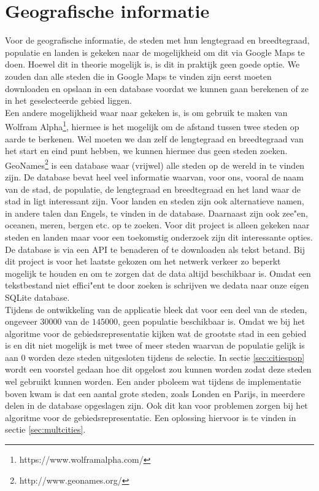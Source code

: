 \documentclass[twoside,openright]{uva-bachelor-thesis}
\begin{document}
	\section{Geografische informatie}
		\label{sec:geo_info}
		Voor de geografische informatie, de steden met hun lengtegraad en breedtegraad, populatie en landen is gekeken naar de mogelijkheid om dit via Google Maps te doen. Hoewel dit in theorie mogelijk is, is dit in praktijk geen goede optie. We zouden dan alle steden die in Google Maps te vinden zijn eerst moeten downloaden en opslaan in een database voordat we kunnen gaan berekenen of ze in het geselecteerde gebied liggen.
		\\[0.5cm]
		Een andere mogelijkheid waar naar gekeken is, is om gebruik te maken van Wolfram Alpha\footnote{https://www.wolframalpha.com/}, hiermee is het mogelijk om de afstand tussen twee steden op aarde te berkenen. Wel moeten we dan zelf de lengtegraad en breedtegraad van het start en eind punt hebben, we kunnen hiermee dus geen steden zoeken.
		\\[0.5cm]
		GeoNames\footnote{http://www.geonames.org/} is een database waar (vrijwel) alle steden op de wereld in te vinden zijn. De database bevat heel veel informatie waarvan, voor ons, vooral de naam van de stad, de populatie, de lengtegraad en breedtegraad en het land waar de stad in ligt interessant zijn. Voor landen en steden zijn ook alternatieve namen, in andere talen dan Engels, te vinden in de database. Daarnaast zijn ook zee"en, oceanen, meren, bergen etc. op te zoeken. Voor dit project is alleen gekeken naar steden en landen maar voor een toekomstig onderzoek zijn dit interessante opties.
		\\[0.5cm]
		De database is via een API te benaderen of te downloaden als tekst betand. Bij dit project is voor het laatste gekozen om het netwerk verkeer zo beperkt mogelijk te houden en om te zorgen dat de data altijd beschikbaar is. Omdat een tekstbestand niet effici"ent te door zoeken is schrijven we dedata naar onze eigen SQLite database.
		\\[0.5cm]
		Tijdens de ontwikkeling van de applicatie bleek dat voor een deel van de steden, ongeveer $30000$ van de $145000$, geen populatie beschikbaar is. Omdat we bij het algoritme voor de gebiedsrepresentatie kijken wat de grootste stad in een gebied is en dit niet mogelijk is met twee of meer steden waarvan de populatie gelijk is aan $0$ worden deze steden uitgesloten tijdens de selectie. In sectie \ref{sec:citiespop} wordt een voorstel gedaan hoe dit opgelost zou kunnen worden zodat deze steden wel gebruikt kunnen worden. Een ander pboleem wat tijdens de implementatie boven kwam is dat een aantal grote steden, zoals Londen en Parijs, in meerdere delen in de database opgeslagen zijn. Ook dit kan voor problemen zorgen bij het algoritme voor de gebiedsrepresentatie. Een oplossing hiervoor is te vinden in sectie \ref{sec:multcities}.
\end{document}
